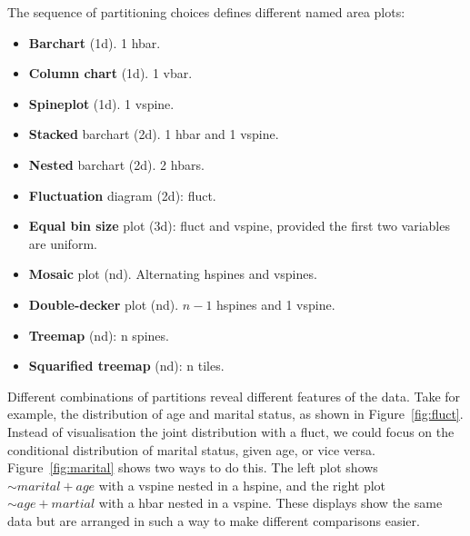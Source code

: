 \documentclass[letterpaper,oneside]{scrartcl}
\begin{document}
The sequence of partitioning choices defines different named area plots:

\begin{itemize}
  \item {\bf Barchart} (1d). 1 hbar.
  \item {\bf Column chart} (1d). 1 vbar.
  \item {\bf Spineplot} (1d). 1 vspine.

  \item {\bf Stacked} barchart (2d). 1 hbar and 1 vspine.
  \item {\bf Nested} barchart (2d).  2 hbars. \citep{peltier:2009}
  \item {\bf Fluctuation} diagram (2d): fluct. 

  \item {\bf Equal bin size} plot (3d): fluct and vspine, provided the first two variables are uniform.

  \item {\bf Mosaic} plot (nd).  Alternating hspines and vspines.  \citep{hartigan:1984,hartigan:1981,friendly:1994,hofmann:2003}
  \item {\bf Double-decker} plot (nd).  $n-1$ hspines and 1 vspine. \citep{hofmann:2001}
  \item {\bf Treemap} (nd): n spines. \citep{shneiderman:1992}
  \item {\bf Squarified treemap} (nd): n tiles. \citep{bruls:1999}
  
\end{itemize}

Different combinations of partitions reveal different features of the data. Take for example, the distribution of age and marital status, as shown in Figure~\ref{fig:fluct}. Instead of visualisation the joint distribution with a fluct, we could focus on the conditional distribution of marital status, given age, or vice versa. Figure~\ref{fig:marital} shows two ways to do this. The left plot shows $\sim marital + age$ with a vspine nested in a hspine, and the right plot $\sim age + martial$ with a hbar nested in a vspine. These displays show the same data but are arranged in such a way to make different comparisons easier.
\end{document}
